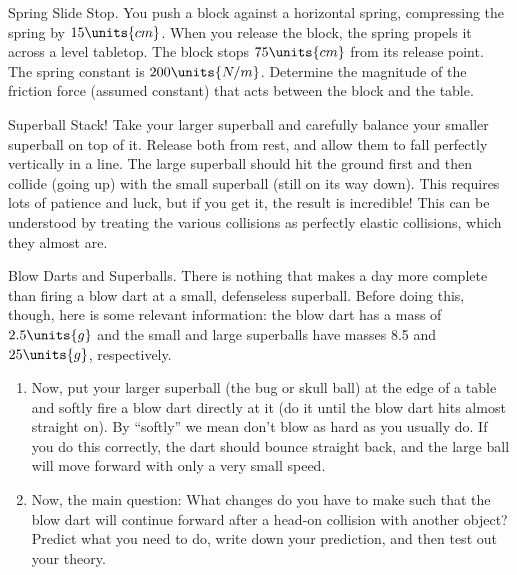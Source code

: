 \begin{aproblem}{Spring Slide Stop.}
  You push a block against a horizontal spring, compressing the spring
  by $15\units{cm}$.  When you release the block, the spring propels
  it across a level tabletop.  The block stops $75\units{cm}$ from
  its release point.  The spring constant is $200\units{N/m}$.
  Determine the magnitude of the friction force (assumed constant)
  that acts between the block and the table.
\end{aproblem}



\begin{aproblem}{Superball Stack!}
  Take your larger superball and carefully balance your smaller
  superball on top of it.  Release both from rest, and allow them to
  fall perfectly vertically in a line.  The large superball should hit
  the ground first and then collide (going up) with the small
  superball (still on its way down).  This requires lots of patience
  and luck, but if you get it, the result is incredible!  This can be
  understood by treating the various collisions as perfectly elastic
  collisions, which they almost are.  
\end{aproblem}



\begin{aproblem}{Blow Darts and Superballs.}
  There is nothing that makes a day more complete than firing a blow
  dart at a small, defenseless superball.  Before doing this, though,
  here is some relevant information: the blow dart has a mass of
  $2.5\units{g}$ and the small and large superballs have masses 8.5
  and $25\units{g}$, respectively.
  \begin{enumerate}
  \item Now, put your larger superball (the bug or skull ball) at the
    edge of a table and softly fire a blow dart directly at it (do it
    until the blow dart hits almost straight on).  By ``softly'' we
    mean don't blow as hard as you usually do.  If you do this
    correctly, the dart should bounce straight back, and the large
    ball will move forward with only a very small speed.

  \item Now, the main question: What changes do you have to make such
    that the blow dart will continue forward after a head-on collision
    with another object?  Predict what you need to do, write down your
    prediction, and then test out your theory.
  \end{enumerate}
  \label{prob:blow_dart_superball}
\end{aproblem}

